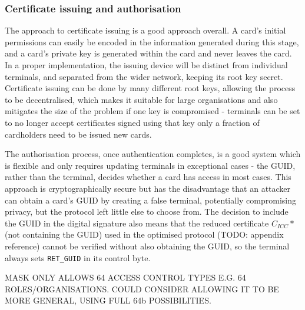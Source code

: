 \documentclass[12pt]{article}
\begin{document}
\subsubsection{Certificate issuing and authorisation}
The approach to certificate issuing is a good approach overall. A card's initial permissions can easily be encoded in the information generated during this stage, and a card's private key is generated within the card and never leaves the card. In a proper implementation, the issuing device will be distinct from individual terminals, and separated from the wider network, keeping its root key secret. Certificate issuing can be done by many different root keys, allowing the process to be decentralised, which makes it suitable for large organisations and also mitigates the size of the problem if one key is compromised - terminals can be set to no longer accept certificates signed using that key only a fraction of cardholders need to be issued new cards.

The authorisation process, once authentication completes, is a good system which is flexible and only requires updating terminals in exceptional cases - the GUID, rather than the terminal, decides whether a card has access in most cases. This approach is cryptographically secure but has the disadvantage that an attacker can obtain a card's GUID by creating a false terminal, potentially compromising privacy, but the protocol left little else to choose from. The decision to include the GUID in the digital signature also means that the reduced certificate $C_{ICC}*$ (not containing the GUID) used in the optimised protocol (TODO: appendix reference) cannot be verified without also obtaining the GUID, so the terminal always sets \verb|RET_GUID| in its control byte.

MASK ONLY ALLOWS 64 ACCESS CONTROL TYPES E.G. 64 ROLES/ORGANISATIONS. COULD CONSIDER ALLOWING IT TO BE MORE GENERAL, USING FULL 64b POSSIBILITIES.





\end{document}
